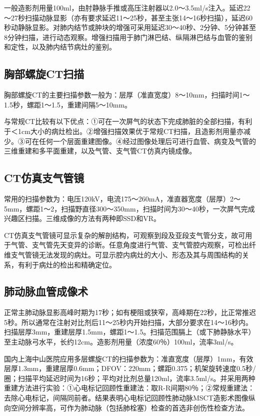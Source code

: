 一般造影剂用量100ml，由肘静脉手推或高压注射器以2.0～3.5ml/s注入。延迟22～27秒扫描动脉显影（亦有要求延迟11～25秒，甚至主张14～16秒扫描），延迟60秒动静脉显影。对肺内结节或肿块的增强可采用延迟30～40秒、2分钟、5分钟甚至8分钟扫描，进行动态观察。增强扫描用于肺门淋巴结、纵隔淋巴结与血管的鉴别和定性，以及肺内结节病灶的鉴别。

\subsection{胸部螺旋CT扫描}

胸部螺旋CT的主要扫描参数一般为：层厚（准直宽度）8～10mm，扫描时间1～1.5秒，螺距1～1.5，重建间隔5～10mm。

与常规CT比较有以下优点：①可在一次屏气的状态下完成肺脏的全部扫描，有利于＜1cm大小的病灶检出。②增强扫描效果优于常规CT扫描，且造影剂用量亦减少。③可在任何一个层面重建图像。④经过图像处理后可进行血管、病变及气管的三维重建和多平面重建，以及气管、支气管CT仿真内镜成像。

\subsection{CT仿真支气管镜}

常用的扫描参数为：电压120kV，电流175～260mA，准直器宽度（层厚）2～5mm，螺距1～2，扫描野直径300～350mm，扫描时间为30～40秒，一次屏气完成兴趣区扫描。三维成像的方法有两种即SSD和VR。

CT仿真支气管镜可显示复杂的解剖结构，可观察到段及亚段支气管分支，故可用于气管、支气管先天变异的诊断。任意角度进行气管、支气管腔内观察，可检出纤维支气管镜无法发现的病灶。可显示腔内病灶的大小、形态及其与周围结构的关系，有利于病灶的检出和精确定位。

\subsection{肺动脉血管成像术}

正常主肺动脉显影高峰时期为17秒；如有梗阻或狭窄，高峰期在22秒，比正常推迟5秒。所以通常在注射对比剂后11～25秒内开始扫描，大部分要求在14～16秒内。扫描层厚3mm，重建层厚1.5mm，螺距1～1.5。扫描范围膈上（或下肺静脉水平）至主动脉弓水平，长约12cm。造影剂用量（浓度60％）100ml，流率3ml/s。

国内上海中山医院应用多层螺旋CT的扫描参数为：准直宽度（层厚）1mm，有效层厚1.3mm，重建层厚0.6mm；DFOV：220mm；螺距0.375；机架旋转速度0.5秒/圈；扫描平均延迟时间为16秒；平均对比剂总量120ml，流率3.5ml/s。并采用两种重建方法进行实验：①心电标记回顾性重建法：取R-R间期80％；②常规重建法：去除心电标记，间隔同前者。结果表明心电标记回顾性肺动脉MSCT造影术图像纵向空间分辨率高，可作为肺动脉（包括肺栓塞）检查的首选非创伤性检查方法。

